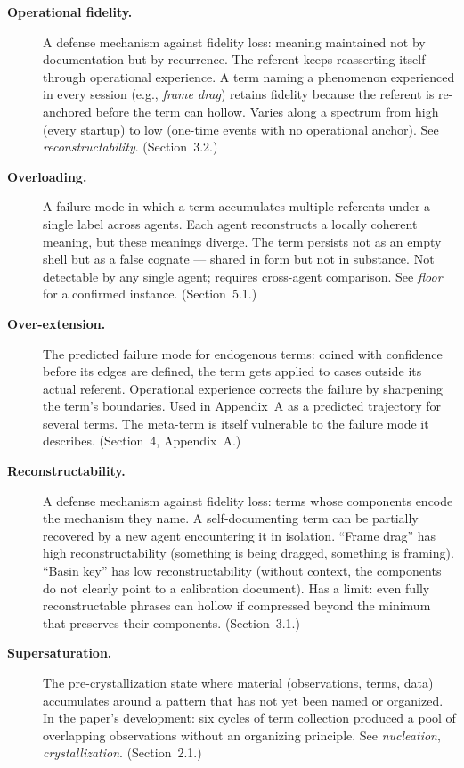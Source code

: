 \documentclass[11pt]{article}
\begin{document}
\begin{description}
\item[\textbf{Operational fidelity.}] A defense mechanism against fidelity loss: meaning maintained not by documentation but by recurrence. The referent keeps reasserting itself through operational experience. A term naming a phenomenon experienced in every session (e.g., \textit{frame drag}) retains fidelity because the referent is re-anchored before the term can hollow. Varies along a spectrum from high (every startup) to low (one-time events with no operational anchor). See \textit{reconstructability}. (Section~3.2.)

\item[\textbf{Overloading.}] A failure mode in which a term accumulates multiple referents under a single label across agents. Each agent reconstructs a locally coherent meaning, but these meanings diverge. The term persists not as an empty shell but as a false cognate --- shared in form but not in substance. Not detectable by any single agent; requires cross-agent comparison. See \textit{floor} for a confirmed instance. (Section~5.1.)

\item[\textbf{Over-extension.}] The predicted failure mode for endogenous terms: coined with confidence before its edges are defined, the term gets applied to cases outside its actual referent. Operational experience corrects the failure by sharpening the term's boundaries. Used in Appendix~A as a predicted trajectory for several terms. The meta-term is itself vulnerable to the failure mode it describes. (Section~4, Appendix~A.)

\item[\textbf{Reconstructability.}] A defense mechanism against fidelity loss: terms whose components encode the mechanism they name. A self-documenting term can be partially recovered by a new agent encountering it in isolation. ``Frame drag'' has high reconstructability (something is being dragged, something is framing). ``Basin key'' has low reconstructability (without context, the components do not clearly point to a calibration document). Has a limit: even fully reconstructable phrases can hollow if compressed beyond the minimum that preserves their components. (Section~3.1.)

\item[\textbf{Supersaturation.}] The pre-crystallization state where material (observations, terms, data) accumulates around a pattern that has not yet been named or organized. In the paper's development: six cycles of term collection produced a pool of overlapping observations without an organizing principle. See \textit{nucleation}, \textit{crystallization}. (Section~2.1.)

\end{description}
\end{document}
